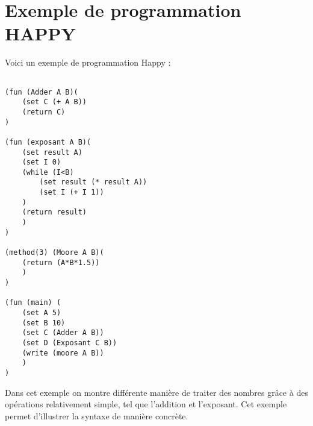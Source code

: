\section{Exemple de programmation HAPPY}

Voici un exemple de programmation Happy :

\begin{verbatim}

(fun (Adder A B)(
	(set C (+ A B))
	(return C)
)

(fun (exposant A B)(
	(set result A)
	(set I 0)
	(while (I<B) 
		(set result (* result A))
		(set I (+ I 1))
	)
	(return result)
	)
)

(method(3) (Moore A B)(
	(return (A*B*1.5))
	)
)

(fun (main) (
	(set A 5)
	(set B 10)
	(set C (Adder A B))
	(set D (Exposant C B))
	(write (moore A B))
	)
)

\end{verbatim}

Dans cet exemple on montre différente manière de traiter des nombres grâce à des opérations relativement simple, tel que l'addition et l'exposant. Cet exemple permet d'illustrer la syntaxe de manière concrète.


